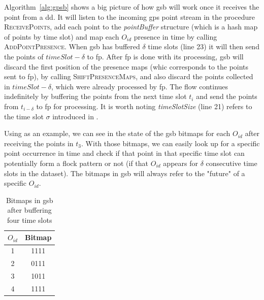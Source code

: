 Algorithm~\ref{alg:gpsb} shows a big picture of how \ac{gsb} will work once it receives the point from a \ac{dd}. It
will listen to the incoming \ac{gps} point stream in the procedure \textsc{ReceivePoints}, add each point to the
\textit{pointBuffer} structure (which is a hash map of points by time slot) and map each $O_{id}$ presence in time by
calling \textsc{AddPointPresence}. When \ac{gsb} has buffered $\delta$ time slots (line 23) it will then send the points
of $timeSlot - \delta$ to \ac{fp}. After \ac{fp} is done with its processing, \ac{gsb} will discard the first position
of the presence maps (whic corresponds to the points sent to \ac{fp}), by calling \textsc{ShiftPresenceMaps}, and also
discard the points collected in $timeSlot - \delta$, which were already processed by \ac{fp}. The flow continues
indefinitely by buffering the points from the next time slot $t_i$ and send the points from $t_{i - \delta}$ to \ac{fp}
for processing. It is worth noting \textit{timeSlotSize} (line 21) refers to the time slot $\sigma$ introduced in
.

Using  as an example, we can see in  the state of the \ac{gsb} bitmaps for each
$O_{id}$ after receiving the points in $t_3$. With those bitmaps, we can easily look up for a specific point occurrence
in time and check if that point in that specific time slot can potentially form a flock pattern or not (if that $O_{id}$
appears for $\delta$ consecutive time slots in the dataset). The bitmaps in \ac{gsb} will always refer to the "future"
of a specific $O_{id}$.

\begin{table}[h!]
    \renewcommand{\arraystretch}{1.3}
    \caption{Bitmaps in \ac{gsb} after buffering four time slots}
    \label{tab:bitmaps}
    \centering
    \begin{tabular}{c|c}
        \hline
        $O_{id}$ &   Bitmap\\
        \hline
        \hline
        1        &   1111\\
        \hline
        2        &   0111\\
        \hline
        3        &   1011\\
        \hline
        4        &   1111\\
        \hline
    \end{tabular}
\end{table}

